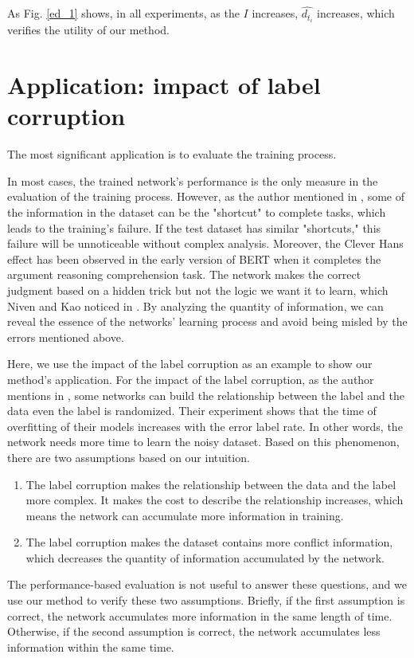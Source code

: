 \documentclass[letterpaper]{article} %
\begin{document}
As Fig. \ref{ed_1} shows, in all experiments, as the $I$ increases, $\hat{d_{t_i}}$ increases, which verifies the utility of our method.

\section{Application: impact of label corruption}
The most significant application is to evaluate the training process.

In most cases, the trained network's performance is the only measure in the evaluation of the training process. However, as the author mentioned in \cite{geirhos2020shortcut}, some of the information in the dataset can be the "shortcut" to complete tasks, which leads to the training's failure. If the test dataset has similar "shortcuts," this failure will be unnoticeable without complex analysis. Moreover, the Clever Hans effect has been observed in the early version of BERT \cite{devlin2018bert} when it completes the argument reasoning comprehension task. The network makes the correct judgment based on a hidden trick but not the logic we want it to learn, which Niven and Kao noticed in \cite{niven2019probing} . By analyzing the quantity of information, we can reveal the essence of the networks' learning process and avoid being misled by the errors mentioned above.

Here, we use the impact of the label corruption as an example to show our method's application. For the impact of the label corruption, as the author mentions in \cite{zhang2016understanding}, some networks can build the relationship between the label and the data even the label is randomized. Their experiment shows that the time of overfitting of their models increases with the error label rate. In other words, the network needs more time to learn the noisy dataset. Based on this phenomenon, there are two assumptions based on our intuition.

\begin{enumerate}
    \item The label corruption makes the relationship between the data and the label more complex. It makes the cost to describe the relationship increases, which means the network can accumulate more information in training.
    \item The label corruption makes the dataset contains more conflict information, which decreases the quantity of information accumulated by the network.
\end{enumerate}
The performance-based evaluation is not useful to answer these questions, and we use our method to verify these two assumptions. Briefly, if the first assumption is correct, the network accumulates more information in the same length of time. Otherwise, if the second assumption is correct, the network accumulates less information within the same time.
\end{document}
